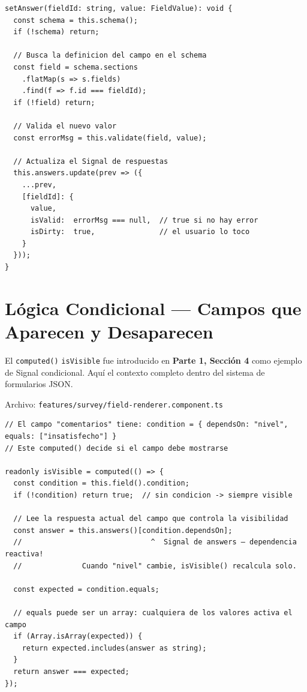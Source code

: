 \documentclass[12pt, a4paper]{article}
\begin{document}
\begin{lstlisting}
setAnswer(fieldId: string, value: FieldValue): void {
  const schema = this.schema();
  if (!schema) return;

  // Busca la definicion del campo en el schema
  const field = schema.sections
    .flatMap(s => s.fields)
    .find(f => f.id === fieldId);
  if (!field) return;

  // Valida el nuevo valor
  const errorMsg = this.validate(field, value);

  // Actualiza el Signal de respuestas
  this.answers.update(prev => ({
    ...prev,
    [fieldId]: {
      value,
      isValid:  errorMsg === null,  // true si no hay error
      isDirty:  true,               // el usuario lo toco
    }
  }));
}
\end{lstlisting}

\section{  Lógica Condicional --- Campos que Aparecen y Desaparecen}

El \texttt{computed()} \texttt{isVisible} fue introducido en \textbf{Parte 1, Sección 4} como ejemplo de Signal condicional.
Aquí el contexto completo dentro del sistema de formularios JSON.

Archivo: \textcolor{morado}{\texttt{features/survey/field-renderer.component.ts}}

\begin{lstlisting}
// El campo "comentarios" tiene: condition = { dependsOn: "nivel", equals: ["insatisfecho"] }
// Este computed() decide si el campo debe mostrarse

readonly isVisible = computed(() => {
  const condition = this.field().condition;
  if (!condition) return true;  // sin condicion -> siempre visible

  // Lee la respuesta actual del campo que controla la visibilidad
  const answer = this.answers()[condition.dependsOn];
  //                              ^  Signal de answers — dependencia reactiva!
  //              Cuando "nivel" cambie, isVisible() recalcula solo.

  const expected = condition.equals;

  // equals puede ser un array: cualquiera de los valores activa el campo
  if (Array.isArray(expected)) {
    return expected.includes(answer as string);
  }
  return answer === expected;
});
\end{lstlisting}
\end{document}
